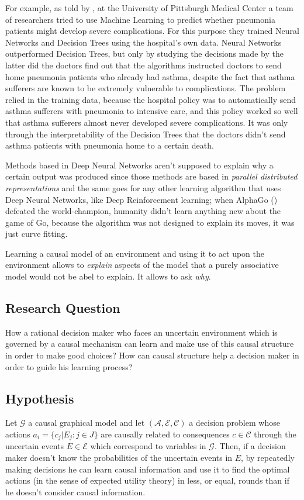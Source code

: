 \documentclass[11pt]{article}
\theoremstyle{plain}
\begin{document}
	For example, as told by \cite{bornstein2016artificial}, at the University of Pittsburgh Medical Center a team of researchers tried to use Machine Learning to predict whether pneumonia patients might develop severe complications. For this purpose they trained Neural Networks and Decision Trees using the hospital's own data. Neural Networks outperformed Decision Trees, but only by studying the decisions made by the latter did the doctors find out that the algorithms instructed doctors to send home pneumonia patients who already had asthma, despite the fact that asthma sufferers are known to be extremely vulnerable to complications. The problem relied in the training data, because the hospital policy was to automatically send asthma sufferers with pneumonia to intensive care, and this policy worked so well that asthma sufferers almost never developed severe complications. It was only through the interpretability of the Decision Trees that the doctors didn't send asthma patients with pneumonia home to a certain death. 
	
	Methods based in Deep Neural Networks aren't supposed to explain why a certain output was produced since those methods are based in \textit{parallel distributed representations} and the same goes for any other learning algorithm that uses Deep Neural Networks, like Deep Reinforcement learning; when AlphaGo (\cite{silver2017mastering}) defeated the world-champion, humanity didn't learn anything new about the game of Go, because the algorithm was not designed to explain its moves, it was just curve fitting.
	
	Learning a causal model of an environment and using it to act upon the environment allows to \textit{explain} aspects of the model that a purely associative model would not be abel to explain. It allows to ask \textit{why}. 
	
	
	\subsection{Research Question}
	How a rational decision maker who faces an uncertain environment which is governed by a causal mechanism can learn and make use of this causal structure in order to make good choices? How can causal structure help a decision maker in order to guide his learning process?
	\subsection{Hypothesis}
	Let $\mathcal{G}$ a causal graphical model and let $(\mathcal{A},\mathcal{E},\mathcal{C})$ a decision problem whose actions $a_i = \{ c_j | E_j : j \in J \}$  are causally related to consequences $c \in \mathcal{C}$ through the uncertain events $E \in \mathcal{E}$ which correspond to variables in $\mathcal{G}$. Then, if a decision maker doesn't know the probabilities of the uncertain events in $E$, by repeatedly making decisions he can learn causal information and use it to find the optimal actions (in the sense of expected utility theory) in less, or equal, rounds than if he doesn't consider causal information.
\end{document}
